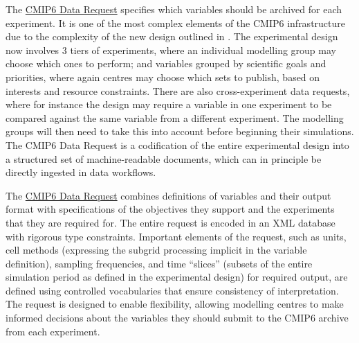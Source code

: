 \documentclass[gmd,manuscript]{copernicus}
\begin{document}
The
\hyperlink{http://clipc-services.ceda.ac.uk/dreq/index.html}{CMIP6 Data Request}
specifies which variables should be archived for
each experiment.  It is one of the most complex elements of the
CMIP6 infrastructure due to the complexity of the
new design outlined in \cite{ref:eyringetal2016a}. The experimental
design now involves 3 tiers of experiments, where an individual
modelling group may choose which ones to perform; and variables grouped
by scientific goals and priorities, where again centres may choose
which sets to publish, based on interests and resource constraints.
There are also cross-experiment data requests, where for instance the
design may require a variable in one experiment to be compared against
the same variable from a different experiment. The modelling groups
will then need to take this into account before beginning their
simulations. The CMIP6 Data Request is a codification of the entire
experimental design into a structured set of machine-readable
documents, which can in principle be directly ingested in data
workflows.

The
\hyperlink{http://clipc-services.ceda.ac.uk/dreq/index.html}{CMIP6 Data Request}
\citep{ref:juckesetal2015} combines definitions of variables and their
output format with specifications of the objectives they support and
the experiments that they are required for. The entire request is
encoded in an XML database with rigorous type constraints. Important
elements of the request, such as units, cell methods (expressing the
subgrid processing implicit in the variable definition), sampling
frequencies, and time ``slices'' (subsets of the entire simulation
period as defined in the experimental design) for required output, are
defined using controlled vocabularies that ensure
consistency of interpretation. The request is designed to enable flexibility,
allowing modelling centres to make informed decisions about the
variables they should submit to the CMIP6 archive from each
experiment.


\end{document}
